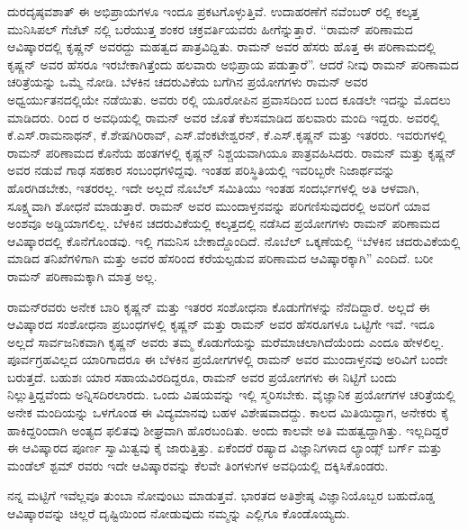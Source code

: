 ದುರದೃಷ್ಠವಶಾತ್ ಈ ಅಭಿಪ್ರಾಯಗಳೂ ಇಂದೂ ಪ್ರಕಟಗೊಳ್ಳುತ್ತಿವೆ. ಉದಾಹರಣೆಗೆ ನವೆಂಬರ್ ರಲ್ಲಿ ಕಲ್ಕತ್ತ ಮುನಿಸಿಪಲ್ ಗೆಜೆಟ್ ನಲ್ಲಿ ಬರೆಯುತ್ತ ಶಂಕರ ಚಕ್ರವರ್ತಿಯವರು ಹೀಗೆನ್ನುತ್ತಾರೆ. \enginline{--} “ರಾಮನ್ ಪರಿಣಾಮದ ಆವಿಷ್ಕಾರದಲ್ಲಿ ಕೃಷ್ಣನ್ ಅವರದ್ದು ಮಹತ್ವದ ಪಾತ್ರವಿದ್ದಿತು. ರಾಮನ್ ಅವರ ಹೆಸರು ಹೊತ್ತ ಈ ಪರಿಣಾಮದಲ್ಲಿ ಕೃಷ್ಣನ್ ಅವರ ಹೆಸರೂ ಇರಬೇಕಾಗಿತ್ತೆಂದು ಹಲವಾರು ಅಭಿಪ್ರಾಯ ಪಡುತ್ತಾರೆ”. ಆದರೆ ನೀವು ರಾಮನ್ ಪರಿಣಾಮದ ಚರಿತ್ರೆಯನ್ನು ಒಮ್ಮೆ ನೋಡಿ. ಬೆಳಕಿನ ಚದರುವಿಕೆಯ ಬಗೆಗಿನ ಪ್ರಯೋಗಗಳು ರಾಮನ್ ಅವರ ಅಧ್ವರ್ಯುತನದಲ್ಲಿಯೇ ನಡೆಯಿತು. ಅವರು ರಲ್ಲಿ ಯೂರೋಪಿನ ಪ್ರವಾಸದಿಂದ ಬಂದ ಕೂಡಲೇ ಇದನ್ನು ಮೊದಲು ಮಾಡಿದರು.  ರಿಂದ  ರ ಅವಧಿಯಲ್ಲಿ ರಾಮನ್ ಅವರ ಜೊತೆ ಕೆಲಸಮಾಡಿದ ಹಲವಾರು ಮಂದಿ ಇದ್ದರು. ಅವರಲ್ಲಿ ಕೆ.ಎಸ್.ರಾಮನಾಥನ್, ಕೆ.ಶೇಷಗಿರಿರಾವ್, ಎಸ್.ವೆಂಕಟೇಶ್ವರನ್, ಕೆ.ಎಸ್.ಕೃಷ್ಣನ್ ಮತ್ತು ಇತರರು. ಇವರುಗಳಲ್ಲಿ ರಾಮನ್ ಪರಿಣಾಮದ ಕೊನೆಯ ಹಂತಗಳಲ್ಲಿ ಕೃಷ್ಣನ್ ನಿಶ್ಚಯವಾಗಿಯೂ ಪಾತ್ರವಹಿಸಿದರು. ರಾಮನ್ ಮತ್ತು ಕೃಷ್ಣನ್ ಅವರ ನಡುವೆ ಗಾಢ ಸಹಕಾರ ಸಂಬಂಧಗಳಿದ್ದವು. ಇಂತಹ ಪರಿಸ್ಥಿತಿಯಲ್ಲಿ ಇವರಿಬ್ಬರೇ ನಿಜಾರ್ಥವನ್ನು ಹೊರಗಿಡಬೇಕು, ಇತರರಲ್ಲ. ಇದೇ ಅಲ್ಲದೆ ನೊಬೆಲ್ ಸಮಿತಿಯು ಇಂತಹ ಸಂದರ್ಭಗಳಲ್ಲಿ ಅತಿ ಆಳವಾಗಿ, ಸೂಕ್ಷ್ಮವಾಗಿ ಶೋಧನೆ ಮಾಡುತ್ತಾರೆ. ರಾಮನ್ ಅವರ ಮುಂದಾಳ್ತನವನ್ನು ಪರಿಗಣಿಸುವುದರಲ್ಲಿ ಅವರಿಗೆ ಯಾವ ಅಂಶವೂ ಅಡ್ಡಿಯಾಗಲಿಲ್ಲ. ಬೆಳಕಿನ ಚದರುವಿಕೆಯಲ್ಲಿ ಕಲ್ಕತ್ತದಲ್ಲಿ ನಡೆಸಿದ ಪ್ರಯೋಗಗಳು ರಾಮನ್ ಪರಿಣಾಮದ ಆವಿಷ್ಕಾರದಲ್ಲಿ ಕೊನೆಗೊಂಡವು. ಇಲ್ಲಿ ಗಮನಿಸ ಬೇಕಾದ್ದೊಂದಿದೆ. ನೊಬೆಲ್ ಒಕ್ಕಣೆಯಲ್ಲಿ \enginline{--} “ಬೆಳಕಿನ ಚದರುವಿಕೆಯಲ್ಲಿ ಮಾಡಿದ ತನಿಖೆಗಳಿಗಾಗಿ ಮತ್ತು ಅವರ ಹೆಸರಿಂದ ಕರೆಯಲ್ಪಡುವ ಪರಿಣಾಮದ ಆವಿಷ್ಕಾರಕ್ಕಾಗಿ”\enginline{--} ಎಂದಿದೆ. ಬರೀ ರಾಮನ್ ಪರಿಣಾಮಕ್ಕಾಗಿ ಮಾತ್ರ ಅಲ್ಲ.

ರಾಮನ್‍ರವರು ಅನೇಕ ಬಾರಿ ಕೃಷ್ಣನ್ ಮತ್ತು ಇತರರ ಸಂಶೋಧನಾ ಕೊಡುಗೆಗಳನ್ನು ನೆನೆದಿದ್ದಾರೆ. ಅಲ್ಲದೆ ಈ ಆವಿಷ್ಕಾರದ ಸಂಶೋಧನಾ ಪ್ರಬಂಧಗಳಲ್ಲಿ ಕೃಷ್ಣನ್ ಮತ್ತು ರಾಮನ್ ಅವರ ಹೆಸರೂಗಳೂ ಒಟ್ಟಿಗೇ ಇವೆ. ಇದೂ ಅಲ್ಲದೆ ಸಾರ್ವಜನಿಕವಾಗಿ ಕೃಷ್ಣನ್ ಅವರು ತಮ್ಮ ಕೊಡುಗೆಯನ್ನು ಮರೆಮಾಚಲಾಗಿದೆಯೆಂದು ಎಂದೂ ಹೇಳಲಿಲ್ಲ. ಪೂರ್ವಗ್ರಹವಿಲ್ಲದ ಯಾರಿಗಾದರೂ ಈ ಬೆಳಕಿನ ಪ್ರಯೋಗಗಳಲ್ಲಿ ರಾಮನ್ ಅವರ ಮುಂದಾಳ್ತನವು ಅರಿವಿಗೆ ಬಂದೇ ಬರುತ್ತದೆ. ಬಹುಶಃ ಯಾರ ಸಹಾಯವಿರದಿದ್ದರೂ, ರಾಮನ್ ಅವರ ಪ್ರಯೋಗಗಳು ಈ ನಿಟ್ಟಿಗೆ ಬಂದು ನಿಲ್ಲುತ್ತಿದ್ದವೆಂದು ಅನ್ನಿಸದಿರಲಾರದು. ಒಂದು ವಿಷಯವನ್ನು ಇಲ್ಲಿ ಸ್ಮರಿಸಬೇಕು. ವೈಜ್ಞಾನಿಕ ಪ್ರಯೋಗಗಳ ಚರಿತ್ರೆಯಲ್ಲಿ ಅನೇಕ ಮಂದಿಯನ್ನು ಒಳಗೊಂಡ ಈ ವಿದ್ಯಮಾನವು ಬಹಳ ವಿಶೇಷವಾದದ್ದು. ಕಾಲದ ಮಿತಿಯಿದ್ದಾಗ, ಅನೇಕರು ಕೈ ಹಾಕಿದ್ದರಿಂದಾಗಿ ಅಂತ್ಯದ ಫಲಿತವು ಶೀಘ್ರವಾಗಿ ಹೊರಬಂದಿತು. ಅಂದು ಕಾಲವೇ ಅತಿ ಮಹತ್ವದ್ದಾಗಿತ್ತು. ಇಲ್ಲದಿದ್ದರೆ ಈ ಆವಿಷ್ಕಾರದ ಪೂರ್ಣ ಸ್ವಾಮಿತ್ವವು ಕೈ ಜಾರುತ್ತಿತ್ತು. ಏಕೆಂದರೆ ರಷ್ಯಾದ ವಿಜ್ಞಾನಿಗಳಾದ ಲ್ಯಾಂಡ್ಸ್ ಬರ್ಗ್ ಮತ್ತು ಮಂಡೆಲ್ ಶ್ಟಮ್ ರವರು ಇದೇ ಆವಿಷ್ಕಾರವನ್ನು ಕೆಲವೇ ತಿಂಗಳುಗಳ ಅವಧಿಯಲ್ಲಿ ದಕ್ಕಿಸಿಕೊಂಡರು.

ನನ್ನ ಮಟ್ಟಿಗೆ ಇವೆಲ್ಲವೂ ತುಂಬಾ ನೋವುಂಟು ಮಾಡುತ್ತವೆ. ಭಾರತದ ಅತಿಶ್ರೇಷ್ಠ ವಿಜ್ಞಾನಿಯೊಬ್ಬರ ಬಹುದೊಡ್ಡ ಆವಿಷ್ಕಾರವನ್ನು ಚಿಲ್ಲರೆ ದೃಷ್ಟಿಯಿಂದ ನೋಡುವುದು ನಮ್ಮನ್ನು ಎಲ್ಲಿಗೂ ಕೊಂಡೊಯ್ಯದು.



